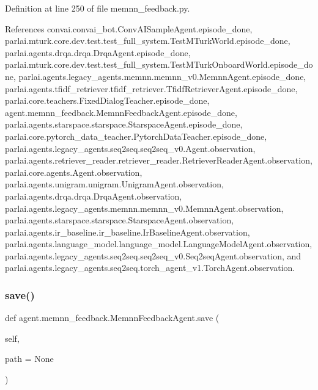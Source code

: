Definition at line 250 of file memnn\+\_\+feedback.\+py.



References convai.\+convai\+\_\+bot.\+Conv\+A\+I\+Sample\+Agent.\+episode\+\_\+done, parlai.\+mturk.\+core.\+dev.\+test.\+test\+\_\+full\+\_\+system.\+Test\+M\+Turk\+World.\+episode\+\_\+done, parlai.\+agents.\+drqa.\+drqa.\+Drqa\+Agent.\+episode\+\_\+done, parlai.\+mturk.\+core.\+dev.\+test.\+test\+\_\+full\+\_\+system.\+Test\+M\+Turk\+Onboard\+World.\+episode\+\_\+done, parlai.\+agents.\+legacy\+\_\+agents.\+memnn.\+memnn\+\_\+v0.\+Memnn\+Agent.\+episode\+\_\+done, parlai.\+agents.\+tfidf\+\_\+retriever.\+tfidf\+\_\+retriever.\+Tfidf\+Retriever\+Agent.\+episode\+\_\+done, parlai.\+core.\+teachers.\+Fixed\+Dialog\+Teacher.\+episode\+\_\+done, agent.\+memnn\+\_\+feedback.\+Memnn\+Feedback\+Agent.\+episode\+\_\+done, parlai.\+agents.\+starspace.\+starspace.\+Starspace\+Agent.\+episode\+\_\+done, parlai.\+core.\+pytorch\+\_\+data\+\_\+teacher.\+Pytorch\+Data\+Teacher.\+episode\+\_\+done, parlai.\+agents.\+legacy\+\_\+agents.\+seq2seq.\+seq2seq\+\_\+v0.\+Agent.\+observation, parlai.\+agents.\+retriever\+\_\+reader.\+retriever\+\_\+reader.\+Retriever\+Reader\+Agent.\+observation, parlai.\+core.\+agents.\+Agent.\+observation, parlai.\+agents.\+unigram.\+unigram.\+Unigram\+Agent.\+observation, parlai.\+agents.\+drqa.\+drqa.\+Drqa\+Agent.\+observation, parlai.\+agents.\+legacy\+\_\+agents.\+memnn.\+memnn\+\_\+v0.\+Memnn\+Agent.\+observation, parlai.\+agents.\+starspace.\+starspace.\+Starspace\+Agent.\+observation, parlai.\+agents.\+ir\+\_\+baseline.\+ir\+\_\+baseline.\+Ir\+Baseline\+Agent.\+observation, parlai.\+agents.\+language\+\_\+model.\+language\+\_\+model.\+Language\+Model\+Agent.\+observation, parlai.\+agents.\+legacy\+\_\+agents.\+seq2seq.\+seq2seq\+\_\+v0.\+Seq2seq\+Agent.\+observation, and parlai.\+agents.\+legacy\+\_\+agents.\+seq2seq.\+torch\+\_\+agent\+\_\+v1.\+Torch\+Agent.\+observation.

\mbox{\label{classagent_1_1memnn__feedback_1_1MemnnFeedbackAgent_adfcb2f89323d006b22e84613e35c7a3c}} 
\subsubsection{\texorpdfstring{save()}{save()}}
{\footnotesize\ttfamily def agent.\+memnn\+\_\+feedback.\+Memnn\+Feedback\+Agent.\+save (\begin{DoxyParamCaption}\item[{}]{self,  }\item[{}]{path = {\ttfamily None} }\end{DoxyParamCaption})}



